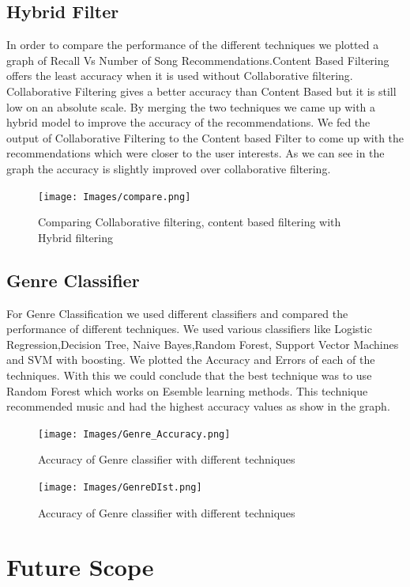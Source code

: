 \documentclass{sig-alternate-05-2015}
\begin{document}
\subsection{Hybrid Filter}
In order to compare the performance of the different techniques we plotted a graph of Recall Vs Number of Song Recommendations.Content Based Filtering offers the least accuracy when it is used without Collaborative filtering. Collaborative Filtering gives a better accuracy than Content Based but it is still low on an absolute scale.
By merging the two techniques we came up with a hybrid model to improve the accuracy of the recommendations. We fed the output of Collaborative Filtering to the Content based Filter to come up with the recommendations which were closer to the user interests. As we can see in the graph the accuracy is slightly improved over collaborative filtering.

\begin{figure}[h]
    \centering
    \texttt{[image: Images/compare.png]}
    \caption{Comparing Collaborative filtering, content based filtering with Hybrid filtering}
\end{figure}

\subsection{Genre Classifier}
For Genre Classification we used different classifiers and compared the performance of different techniques. We used various classifiers like Logistic Regression,Decision Tree, Naive Bayes,Random Forest, Support Vector Machines and SVM with boosting. We plotted the Accuracy and Errors of each of the techniques. With this we could conclude that the best technique was to use Random Forest which works on Esemble learning methods. This technique recommended music and had the highest accuracy values as show in the graph.
\begin{figure}[h]
    \centering
    \texttt{[image: Images/Genre\_Accuracy.png]}
    \caption{Accuracy of Genre classifier with different techniques}
\end{figure}

\begin{figure}[h]
    \centering
    \texttt{[image: Images/GenreDIst.png]}
    \caption{Accuracy of Genre classifier with different techniques}
\end{figure}

\section{Future Scope}
\end{document}

